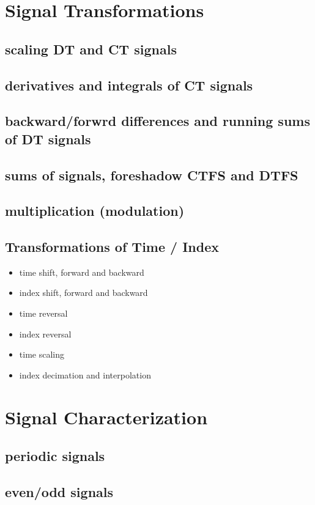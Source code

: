 \documentclass{article}
\begin{document}
\section{Signal Transformations}
\label{sec:org6555689}
\subsection{scaling DT and CT signals}
\label{sec:org0fa5a47}
\subsection{derivatives and integrals of CT signals}
\label{sec:orgb56c3af}
\subsection{backward/forwrd differences and running sums of DT signals}
\label{sec:orgcb4a125}
\subsection{sums of signals, foreshadow CTFS and DTFS}
\label{sec:orge4464f9}
\subsection{multiplication (modulation)}
\label{sec:orgc1443f6}
\subsection{Transformations of Time / Index}
\label{sec:orgb786926}
\begin{itemize}
\item time shift, forward and backward
\item index shift, forward and backward
\item time reversal
\item index reversal
\item time scaling
\item index decimation and interpolation
\end{itemize}
\section{Signal Characterization}
\label{sec:org122fb16}
\subsection{periodic signals}
\label{sec:org5c7f0c9}
\subsection{even/odd signals}
\label{sec:org4721db8}
\end{document}
